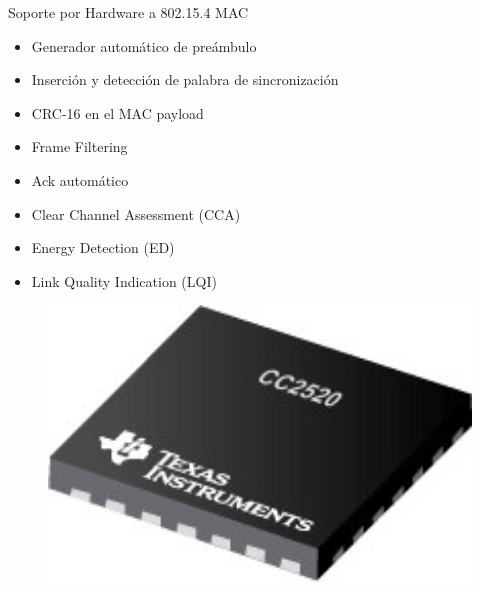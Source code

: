 \documentclass[aspectratio=169, handout]{beamer}
\begin{document}
\begin{frame}{Soporte por Hardware a 802.15.4 MAC} 
\begin{minipage}[c]{1.0\linewidth}
	\begin{minipage}[c]{0.70\linewidth}
		\begin{itemize}
			\vspace{5px}
			\item Generador automático de preámbulo	
			\vspace{5px}
			\item Inserción y detección de palabra de sincronización	
			\vspace{5px}
			\item CRC-16 en el MAC payload
			\vspace{5px}
			\item Frame Filtering
			\vspace{5px}
			\item Ack automático
			\vspace{5px}
			\item Clear Channel Assessment (CCA)
			\vspace{5px}
			\item Energy Detection (ED)
			\vspace{5px}
			\item Link Quality Indication (LQI)
		\end{itemize}
	\end{minipage}
	\begin{minipage}[c]{0.25\linewidth}
		\begin{figure}[H]
			\includegraphics[width=1\textwidth]{./imagenes/cc2520.jpg}
		\end{figure}	  	  	
	\end{minipage}
\end{minipage}
\end{frame}
\end{document}
